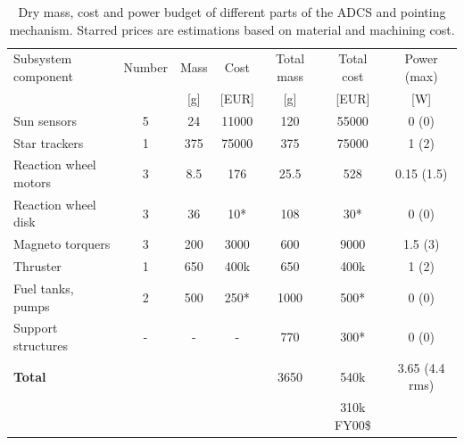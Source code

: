 \begin{table}[h]
\begin{tabular}{l | c | c c | c c | c }
Subsystem component    & Number & Mass & Cost & Total mass & Total cost & Power (max)\\ 
                       &   & [g] & [EUR]& [g]  &[EUR] & [W]         \\ \hline \hline
Sun sensors            & 5 & 24  & 11000& 120   & 55000&  0 (0)      \\
Star trackers          & 1 & 375 & 75000& 375  & 75000&  1 (2)      \\ \hline
Reaction wheel motors  & 3 & 8.5 & 176  & 25.5 & 528  &  0.15 (1.5) \\
Reaction wheel disk    & 3 & 36  & 10*  & 108   & 30*  &  0 (0)      \\
Magneto torquers       & 3 & 200 & 3000 & 600  & 9000 &  1.5 (3)      \\ \hline
Thruster			   & 1 & 650 & 400k & 650  & 400k &  1 (2)			\\
Fuel tanks, pumps	   & 2 & 500 & 250* & 1000 & 500* & 0 (0)          \\ \hline
Support structures     & - &  -  & -	& 770  & 300*     & 0 (0)			\\ \hline
\textbf{Total} & & &                             & 3650 & 540k & 3.65 (4.4 rms) \\
&&&&& 310k FY00\$ &
\end{tabular}
\caption[Mass, cost and power budget of AODCS and pointing mechanism emitter]{Dry mass, cost and power budget of different parts of the \ac{ADCS} and pointing mechanism. Starred prices are estimations based on material and machining cost.}
\label{tab:adcspointbudgetemitter}
\end{table}